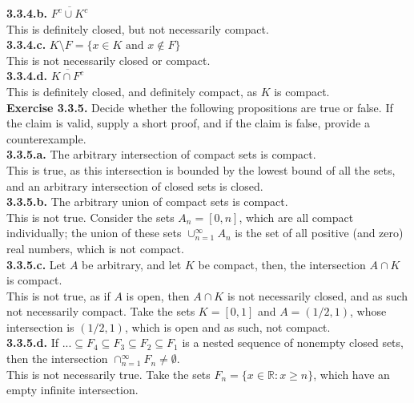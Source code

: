 \documentclass[12pt,letterpaper]{article}
\begin{document}
\textbf{3.3.4.b.} \(\overline{F^{c} \cup K^{c}}\) \\

This is definitely closed, but not necessarily compact. \\

\textbf{3.3.4.c.} \(K \setminus F = \{x \in K \text{ and } x \notin F\}\) \\

This is not necessarily closed or compact. \\

\textbf{3.3.4.d.} \(\overline{K \cap F^{c}}\) \\

This is definitely closed, and definitely compact, as \(K\) is compact. \\

\textbf{Exercise 3.3.5.} Decide whether the following propositions are true or false. If the claim is valid, supply a short proof, and if the claim is false, provide a counterexample. \\

\textbf{3.3.5.a.} The arbitrary intersection of compact sets is compact. \\

This is true, as this intersection is bounded by the lowest bound of all the sets, and an arbitrary intersection of closed sets is closed. \\

\textbf{3.3.5.b.} The arbitrary union of compact sets is compact. \\

This is not true. Consider the sets \(A_{n} = [0,n]\), which are all compact individually; the union of these sets \(\cup_{n=1}^{\infty} A_{n}\) is the set of all positive (and zero) real numbers, which is not compact. \\

\textbf{3.3.5.c.} Let \(A\) be arbitrary, and let \(K\) be compact, then, the intersection \(A \cap K\) is compact. \\

This is not true, as if \(A\) is open, then \(A \cap K\) is not necessarily closed, and as such not necessarily compact. Take the sets \(K = [0,1]\) and \(A = (1/2, 1)\), whose intersection is \((1/2, 1)\), which is open and as such, not compact. \\

\textbf{3.3.5.d.} If \(... \subseteq F_{4} \subseteq F_{3} \subseteq F_{2} \subseteq F_{1}\) is a nested sequence of nonempty closed sets, then the intersection \(\cap_{n=1}^{\infty} F_{n} \neq \emptyset\). \\

This is not necessarily true. Take the sets \(F_{n} = \{x \in \mathbb{R} : x \geq n\}\), which have an empty infinite intersection. \\
\end{document}
